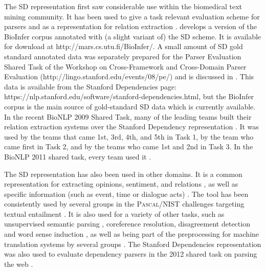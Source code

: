 \documentclass[11pt,letterpaper]{article}
\def\url#1{\textsf{#1}}
\begin{document}
\begin{sloppypar}
The SD representation first saw considerable use within the biomedical text
mining community.  It has been used to give a task relevant evaluation
scheme for parsers \citep{Clegg07,Pyysalo07} and as a representation
for relation extraction
\citep{Erkan07,Greenwood07,Urbain07,Fundel07,Clegg08,Pyysalo08,giles08large,ozgur08identifying,ramakrishnan08discovery,bjorne08how,Yarten10,Bjorne2011,Pyysalo11,Landeghem12}.
\citet{Pyysalo07} develops a version of the BioInfer corpus annotated
with (a slight variant of) the SD scheme.  It is available for
download at \url{http://mars.cs.utu.fi/BioInfer/}.
A small amount of SD gold standard annotated data was separately prepared for the
Parser Evaluation Shared Task of the Workshop on Cross-Framework and
Cross-Domain Parser Evaluation
(\url{http://lingo.stanford.edu/events/08/pe/}) and is discussed in
\citep{demarneffe08stanford}. This data is available from the Stanford
Dependencies page: \url{https://nlp.stanford.edu/software\discretionary{}{}{}/stanford-dependencies.html},
but the BioInfer corpus is the main source of gold-standard SD data which is currently available.
In the recent BioNLP 2009 Shared Task, many of the leading teams built their relation extraction systems over the Stanford Dependency representation \citep{kim09overview}.  It was used by the teams that came 1st, 3rd, 4th, and 5th in Task 1, by the team who came first in Task 2, and by the teams who came 1st and 2nd in Task 3. In the BioNLP 2011 shared task, every team used it \citep{BioNLP11}.
\end{sloppypar}

The SD representation has also been used in other domains.  It is a common representation for
extracting opinions, sentiment, and relations
\citep{Zhuang06cikm,Meena07sentiment,Banko07,Zouaq06tai,Zouaq07tel,chaumartin07knowledge,kessler08icwsm,Haghighi10,Hassan10,Joshi2010,Wu2010,Zouaq10}, as well as specific information (such as event, time or dialogue acts) \citep{Chambers11,McClosky12,Kluwer10}. The tool has been consistently used by several groups in the \textsc{Pascal}/NIST challenges targeting textual entailment \citep{adams-EtAl:2007:WTEP,blake:2007:WTEP,chambers-EtAl:2007:WTEP,harmeling:2007:WTEP,wang-neumann:2007:WTEP,Malakasiotis09,Mehdad09,Shivare2010,Glinos2010,Kouylekov2010,Pakray2011a}. It is also used for a variety of other tasks, such as unsupervised semantic parsing \citep{poon09unsupervised}, coreference resolution, disagreement detection and word sense induction \citep{Chen12,Abbott11,Lau12}, as well as being part of the preprocessing for machine translation systems by several groups \citep{xu09using,genzel10automatically,singh10statistical}.
The Stanford Dependencies representation
was also used to evaluate dependency parsers in the 2012 shared task on parsing the web \citep{Petrov12}.
\end{document}

